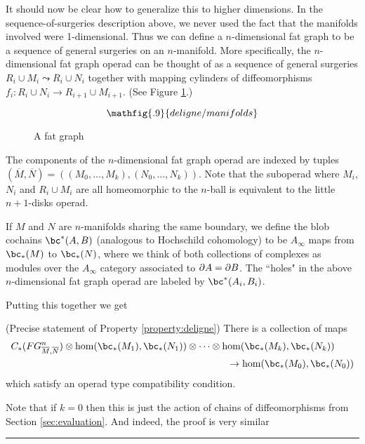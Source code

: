 It should now be clear how to generalize this to higher dimensions.
In the sequence-of-surgeries description above, we never used the fact that the manifolds
involved were 1-dimensional.
Thus we can define a $n$-dimensional fat graph to be a sequence of general surgeries
on an $n$-manifold.
More specifically,
the $n$-dimensional fat graph operad can be thought of as a sequence of general surgeries
$R_i \cup M_i \leadsto R_i \cup N_i$ together with mapping cylinders of diffeomorphisms
$f_i: R_i\cup N_i \to R_{i+1}\cup M_{i+1}$.
(See Figure \ref{delfig2}.)
\begin{figure}[!ht]
$$\mathfig{.9}{deligne/manifolds}$$
\caption{A fat graph}\label{delfig2}\end{figure}
The components of the $n$-dimensional fat graph operad are indexed by tuples
$(\overline{M}, \overline{N}) = ((M_0,\ldots,M_k), (N_0,\ldots,N_k))$.
Note that the suboperad where $M_i$, $N_i$ and $R_i\cup M_i$ are all homeomorphic to 
the $n$-ball is equivalent to the little $n{+}1$-disks operad.


If $M$ and $N$ are $n$-manifolds sharing the same boundary, we define
the blob cochains $\bc^*(A, B)$ (analogous to Hochschild cohomology) to be
$A_\infty$ maps from $\bc_*(M)$ to $\bc_*(N)$, where we think of both
collections of complexes as modules over the $A_\infty$ category associated to $\partial A = \partial B$.
The ``holes" in the above 
$n$-dimensional fat graph operad are labeled by $\bc^*(A_i, B_i)$.

Putting this together we get 
\begin{prop}(Precise statement of Property \ref{property:deligne})
\label{prop:deligne}
There is a collection of maps
\begin{eqnarray*}
	C_*(FG^n_{\overline{M}, \overline{N}})\otimes \hom(\bc_*(M_1), \bc_*(N_1))\otimes\cdots\otimes 
\hom(\bc_*(M_{k}), \bc_*(N_{k})) & \\
	& \hspace{-11em}\to  \hom(\bc_*(M_0), \bc_*(N_0))
\end{eqnarray*}
which satisfy an operad type compatibility condition. 
\end{prop}

Note that if $k=0$ then this is just the action of chains of diffeomorphisms from Section \ref{sec:evaluation}.
And indeed, the proof is very similar 



\medskip
\hrule\medskip

